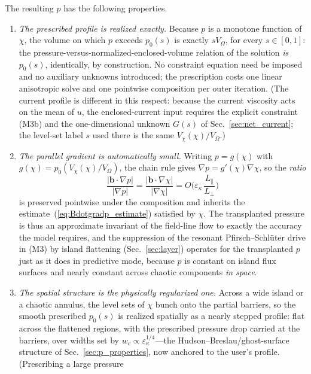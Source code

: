\documentclass[english]{article}
\newcommand{\bb}{\mathbf{b}}
\begin{document}
The resulting $p$ has the following properties.
\begin{enumerate}
\item \emph{The prescribed profile is realized exactly.} Because $p$ is a monotone function of
$\chi$, the volume on which $p$ exceeds $p_0(s)$ is exactly $sV_\Omega$, for every $s\in[0,1]$:
the pressure-versus-normalized-enclosed-volume relation of the solution \emph{is} $p_0(s)$, identically, by
construction. No constraint equation need be imposed and no auxiliary unknowns introduced; the
prescription costs one linear anisotropic solve and one pointwise composition per outer iteration.
(The current profile is different in this respect: because the current viscosity acts on the mean
of $u$, the enclosed-current input requires the explicit constraint (M3b) and the one-dimensional
unknown $G(s)$ of Sec.~\ref{sec:net_current}; the level-set label $s$ used there is the same
$V_\chi(\chi)/V_\Omega$.)
\item \emph{The parallel gradient is automatically small.} Writing $p=g(\chi)$ with
$g(\chi)=p_0(V_\chi(\chi)/V_\Omega)$, the chain rule gives
$\nabla p=g'(\chi)\nabla\chi$, so the \emph{ratio}
\begin{equation}
\frac{|\bb\cdot\nabla p|}{|\nabla p|}=\frac{|\bb\cdot\nabla\chi|}{|\nabla\chi|}
=O\!\Big(\varepsilon_\kappa\,\frac{L_\parallel}{L_\perp}\Big)
\label{eq:ratio_preserved}
\end{equation}
is preserved pointwise under the composition and inherits the estimate~(\ref{eq:Bdotgradp_estimate})
satisfied by $\chi$. The transplanted pressure is thus an approximate invariant of the field-line
flow to exactly the accuracy the model requires, and the suppression of the resonant
Pfirsch--Schl\"uter drive in (M3) by island flattening (Sec.~\ref{sec:layer}) operates for the
transplanted $p$ just as it does in predictive mode, because $p$ is constant on island flux
surfaces and nearly constant across chaotic components \emph{in space}.
\item \emph{The spatial structure is the physically regularized one.} Across a wide island or a
chaotic annulus, the level sets of $\chi$ bunch onto the partial barriers, so the smooth prescribed
$p_0(s)$ is realized spatially as a nearly stepped profile: flat across the flattened regions, with
the prescribed pressure drop carried at the barriers, over widths set by
$w_c\propto\varepsilon_\kappa^{1/4}$---the Hudson--Breslau/ghost-surface structure of
Sec.~\ref{sec:p_properties}, now anchored to the user's profile. (Prescribing a large pressure

\end{enumerate}
\end{document}
